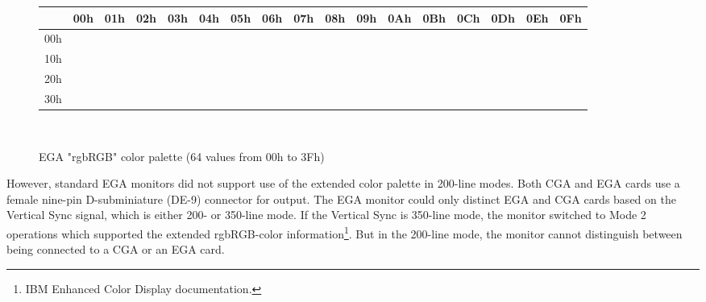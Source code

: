 \documentclass[book.tex]{subfiles}
\begin{document}
\begin{figure}[H]
\centering
\setlength{\tabcolsep}{2.8pt} %
\begin{tabular}{|c|c|c|c|c|c|c|c|c|c|c|c|c|c|c|c|c|}
\hline 
 & 00h & 01h & 02h & 03h & 04h & 05h & 06h & 07h & 08h & 09h & 0Ah & 0Bh & 0Ch & 0Dh & 0Eh & 0Fh \\ \hline
 00h & \cellcolor{CGA_Black} & \cellcolor{CGA_Blue} & \cellcolor{CGA_Green} & \cellcolor{CGA_Cyan} & \cellcolor{CGA_Red} & \cellcolor{CGA_Magenta} & \cellcolor{EGA_06} & \cellcolor{CGA_Light_Grey} & \cellcolor{EGA_08} & \cellcolor{EGA_09} & \cellcolor{EGA_0A} & \cellcolor{EGA_0B} & \cellcolor{EGA_0C} & \cellcolor{EGA_0D} & \cellcolor{EGA_0E} & \cellcolor{EGA_0F} \\ \hline

10h & \cellcolor{EGA_10} & \cellcolor{EGA_11} & \cellcolor{EGA_12} & \cellcolor{EGA_13} & \cellcolor{CGA_Brown} & \cellcolor{EGA_15} & \cellcolor{EGA_16} & \cellcolor{EGA_17} & \cellcolor{EGA_18} & \cellcolor{EGA_19} & \cellcolor{EGA_1A} & \cellcolor{EGA_1B} & \cellcolor{EGA_1C} & \cellcolor{EGA_1D} & \cellcolor{EGA_1E} & \cellcolor{EGA_1F} \\ \hline

20h & \cellcolor{EGA_20} & \cellcolor{EGA_21} & \cellcolor{EGA_22} & \cellcolor{EGA_23} & \cellcolor{EGA_24} & \cellcolor{EGA_25} & \cellcolor{EGA_26} & \cellcolor{EGA_27} & \cellcolor{EGA_28} & \cellcolor{EGA_29} & \cellcolor{EGA_2A} & \cellcolor{EGA_2B} & \cellcolor{EGA_2C} & \cellcolor{EGA_2D} & \cellcolor{EGA_2E} & \cellcolor{EGA_2F} \\ \hline

30h & \cellcolor{EGA_30} & \cellcolor{EGA_31} & \cellcolor{EGA_32} & \cellcolor{EGA_33} & \cellcolor{EGA_34} & \cellcolor{EGA_35} & \cellcolor{EGA_36} & \cellcolor{EGA_37} & \cellcolor{CGA_Dark_Grey} & \cellcolor{CGA_Bright_Blue} & \cellcolor{CGA_Bright_Green} & \cellcolor{CGA_Bright_Cyan} & \cellcolor{CGA_Bright_Red} & \cellcolor{CGA_Bright_Magenta} & \cellcolor{CGA_Bright_Brown} & \cellcolor{CGA_White} \\ \hline


\end{tabular}\\
\setlength{\tabcolsep}{6pt} %
\caption{EGA "rgbRGB" color palette (64 values from 00h to 3Fh)}
\end{figure}

\medskip
\par
However, standard EGA monitors did not support use of the extended color palette in 200-line modes. Both CGA and EGA cards use a female nine-pin D-subminiature (DE-9) connector for output. 
The EGA monitor could only distinct EGA and CGA cards based on the Vertical Sync signal, which is either 200- or 350-line mode. If the Vertical Sync is 350-line mode, the monitor switched to Mode 2 operations which supported the extended rgbRGB-color information\footnote{IBM Enhanced Color Display documentation.}. But in the 200-line mode, the monitor cannot distinguish between being connected to a CGA or an EGA card. \\
\end{document}
